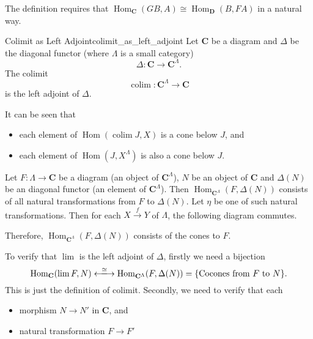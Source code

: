 \documentclass{article}
\begin{document}
The definition requires that $\operatorname{Hom}_{\mathbf{C}}(GB,A) \cong \operatorname{Hom}_{\mathbf{D}}(B,FA)$ in a natural way.
\begin{example}{Colimit as Left Adjoint}{colimit_as_left_adjoint}
    Let $\mathbf{C}$ be a diagram and $\Delta$ be the diagonal functor (where $\Lambda$ is a small category)
    \[ \Delta: \mathbf{C} \rightarrow \mathbf{C}^\Lambda. \]
    The colimit
    \[ \operatorname{colim}: \mathbf{C}^\Lambda \rightarrow \mathbf{C} \]
    is the left adjoint of $\Delta$.
    \par
    It can be seen that
    \begin{itemize}
        \item each element of $\operatorname{Hom}(\operatorname{colim} J, X)$ is a cone below $J$, and
        \item each element of $\operatorname{Hom}(J, X^\Lambda)$ is also a cone below $J$.
    \end{itemize}
\end{example}
Let $F:\Lambda\rightarrow\mathbf{C}$ be a diagram (an object of $\mathbf{C}^\Lambda$), $N$ be an object of $\mathbf{C}$ and $\Delta(N)$ be an diagonal functor (an element of $\mathbf{C}^\Lambda$).
Then $\operatorname{Hom}_{\mathbf{C}^\Lambda}(F, \Delta(N))$ consists of all natural transformations from $F$ to $\Delta(N)$.
Let $\eta$ be one of such natural transformations.
Then for each $X\xrightarrow{f}Y$ of $\Lambda$, the following diagram commutes.
\begin{center}
\end{center}
Therefore, $\operatorname{Hom}_{\mathbf{C}^\Lambda}(F, \Delta(N))$ consists of the cones to $F$.
\par
To verify that  $\lim$ is the left adjoint of $\Delta$, firstly we need a bijection
\[ \operatorname{Hom}_{\mathbf{C}}(\lim F, N) \xlongleftrightarrow{\simeq} \operatorname{Hom}_{\mathbf{C}^\Lambda}(F, \Delta(N)) = \qty{\text{Cocones from } F \text{ to } N}. \]
This is just the definition of colimit.
Secondly, we need to verify that each
\begin{itemize}
    \item morphism $N\rightarrow N'$ in $\mathbf{C}$, and
    \item natural transformation $F\rightarrow F'$
\end{itemize}
\end{document}
